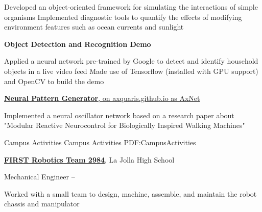 \documentclass[letterpaper,MMMyyyy,nonstopmode]{simpleresumecv}
\begin{document}
\begin{Body}
\Gap
\begin{Detail}
\SubBulletItem
Developed an object-oriented framework for simulating the interactions of 
simple organisms
\SubBulletItem
Implemented diagnostic tools to quantify the effects of modifying 
environment features such as ocean currents and sunlight
\end{Detail}


    

\BigGap
\Entry
\textbf{Object Detection and Recognition Demo}

\Gap
\begin{Detail}
\SubBulletItem
Applied a neural network pre-trained by Google to detect and identify household objects in a live video feed 
\SubBulletItem
Made use of Tensorflow (installed with GPU support) and OpenCV to build the demo
\end{Detail}

\BigGap
\Entry
\href{http://axquaris.github.io/}
{\textbf{Neural Pattern Generator}, on axquaris.github.io as AxNet}

\Gap
\begin{Detail}
\SubBulletItem
Implemented a neural oscillator network based on a research paper about "Modular Reactive Neurocontrol for Biologically Inspired Walking Machines"
\end{Detail}


\Section
{Campus Activities}
{Campus Activities}
{PDF:CampusActivities}

\Entry
\href{https://frcteam2984.github.io/}
{\textbf{FIRST Robotics Team 2984}},
La Jolla High School

\Gap
\BulletItem
Mechanical Engineer
\hfill
{} --
\begin{Detail}
\SubBulletItem
Worked with a small team to design, machine, assemble, and maintain the robot chassis and manipulator
\end{Detail}


\end{Body}
\end{document}
